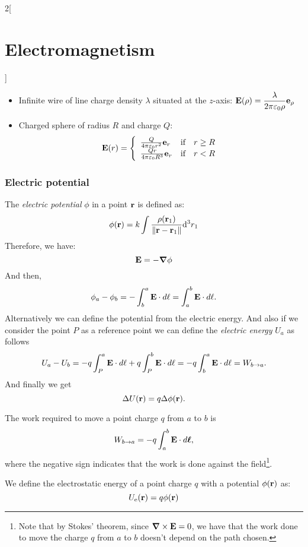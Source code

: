 \documentclass[../../../main.tex]{subfiles}
\begin{document}
\begin{multicols}{2}[\section{Electromagnetism}]
\begin{prop}
\begin{itemize}
      \item Infinite wire of line charge density $\lambda$ situated at the $z$-axis:  $\displaystyle \boldsymbol{\mathrm{E}}(\rho)=\frac{\lambda}{2\pi\varepsilon_0 \rho}\boldsymbol{\mathrm{e}}_\rho$
      \item Charged sphere of radius $R$ and charge $Q$:
            $$\boldsymbol{\mathrm{E}}(r)=\left\{
              \begin{array}{lcc}
                \frac{Q}{4\pi\varepsilon_0r^2}\boldsymbol{\mathrm{e}}_r  & \text{if} & r\geq R \\
                \frac{Qr}{4\pi\varepsilon_0R^3}\boldsymbol{\mathrm{e}}_r & \text{if} & r<R
              \end{array}
              \right.$$
    \end{itemize}
  \end{prop}
  \subsubsection{Electric potential}
  \begin{definition}
    The \emph{electric potential} $\phi$ in a point $\boldsymbol{\mathrm{r}}$ is defined as:
    \begin{equation}
      \phi(\boldsymbol{\mathrm{r}})=k\int\frac{\rho(\boldsymbol{\mathrm{r}}_1)}{\|\boldsymbol{\mathrm{r}}-\boldsymbol{\mathrm{r}}_1\|}\dd^3 r_1
    \end{equation}
    Therefore, we have:
    \begin{equation}
      \boldsymbol{\mathrm{E}}=-\grad\phi
      \label{E_potential}
    \end{equation}
    And then, $$\phi_a-\phi_b=-\int_b^a\boldsymbol{\mathrm{E}}\cdot d\ell=\int_a^b\boldsymbol{\mathrm{E}}\cdot d\ell.$$ Alternatively we can define the potential from the electric energy.  And also if we consider the point $P$ as a reference point we can define the \emph{electric energy} $U_a$ as follows $$U_a-U_b=-q\int_P^a\boldsymbol{\mathrm{E}}\cdot d\ell+q\int_P^b\boldsymbol{\mathrm{E}}\cdot d\ell=-q\int_b^a\boldsymbol{\mathrm{E}}\cdot d\ell=W_{b\to a}.$$ And finally we get $$\Delta U(\boldsymbol{\mathrm{r}})=q\Delta\phi(\boldsymbol{\mathrm{r}}).$$
  \end{definition}
  \begin{prop}[Work]
    The work required to move a point charge $q$ from $a$ to $b$ is $$W_{b\to a}=-q\int_a^b\boldsymbol{\mathrm{E}}\cdot d\boldsymbol{\mathrm{\ell}},$$ where the negative sign indicates that the work is done against the field\footnote{Note that by Stokes' theorem, since $\boldsymbol{\mathrm{\nabla}}\times\boldsymbol{\mathrm{E}}=0$, we have that the work done to move the charge $q$ from $a$ to $b$ doesn't depend on the path chosen.}.
  \end{prop}
  \begin{definition}
    We define the electrostatic energy of a point charge $q$ with a potential $\phi(\boldsymbol{\mathrm{r}})$ as: $$U_\text{e}(\boldsymbol{\mathrm{r}})=q\phi(\boldsymbol{\mathrm{r}})$$

\end{definition}
\end{multicols}
\end{document}
